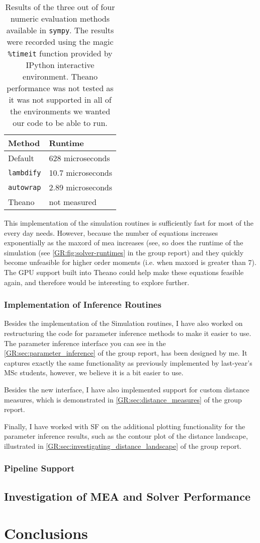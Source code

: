 \begin{table}
    \centering
    \begin{tabular}{l|l}
    Method & Runtime \\
    \hline
    Default & 628 microseconds \\
    \verb"lambdify" & 10.7 microseconds \\
    \verb"autowrap" & 2.89 microseconds \\
    Theano & not measured \\
    \end{tabular}
    \caption{Results of the three out of four numeric evaluation methods available in {\tt sympy}. 
    The results were recorded using the magic {\tt \%timeit} 
    function provided by IPython interactive environment.
    Theano performance was not tested as it was not supported in all of the environments we wanted our code to be able to run.}
    \label{tab:numeric-runtimes}
\end{table}

This implementation of the simulation routines is sufficiently fast for most of the every day needs. 
However, because the number of equations increases exponentially as the \gls{maxord} of \gls{mea} increases (see, so does the runtime of the simulation (see \autoref{GR:fig:solver-runtimes} in the group report) and they quickly become unfeasible for higher order moments (i.e. when \gls{maxord} is greater than 7). 
The GPU support built into Theano could help make these equations feasible again, and therefore would be interesting to explore further.

\subsubsection{Implementation of Inference Routines}

Besides the implementation of the Simulation routines, I have also worked on restructuring the code for parameter inference methods to make it easier to use. 
The parameter inference interface you can see in the \autoref*{GR:sec:parameter_inference} of the group report, has been designed by me. 
It captures exactly the same functionality as previously implemented by last-year's MSc students, however, we believe it is a bit easier to use.

Besides the new interface, I have also implemented support for custom distance measures, which is demonstrated in \autoref*{GR:sec:distance_measures} of the group report. 

Finally, I have worked with SF on the additional plotting functionality for the parameter inference results, such as the contour plot of the distance landscape, illustrated in \autoref*{GR:sec:investigating_distance_landscape} of the group report.

\subsubsection{Pipeline Support}

\subsection{Investigation of MEA and Solver Performance}

\section{Conclusions}

